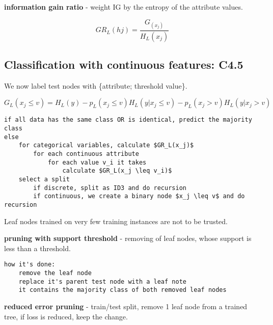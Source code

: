 \documentclass{article}
\newcommand{\para}[0]{\par\vspace{0.2cm}\noindent}
\newcommand{\define}[2]{\textbf{#1} - {#2}.  \para}
\begin{document}
\define{information gain ratio}
           {weight IG by the entropy of the attribute values}
$$ GR_L(hj) = \frac{G_(x_j)}{H_L(x_j)} $$


\subsection{Classification with continuous features: C4.5}
We now label test nodes with \{attribute; threshold value\}.

$$ G_L(x_j \leq v) = H_L(y) - p_L(x_j \leq v) H_L(y|x_j \leq v) - p_L(x_j > v) H_L(y|x_j > v)$$

\begin{verbatim}
if all data has the same class OR is identical, predict the majority class
else
    for categorical variables, calculate $GR_L(x_j)$
        for each continuous attribute
            for each value v_i it takes
                calculate $GR_L(x_j \leq v_i)$
    select a split
        if discrete, split as ID3 and do recursion
        if continuous, we create a binary node $x_j \leq v$ and do recursion
\end{verbatim}

Leaf nodes trained on very few training instances are not to be trusted.

\define{pruning with support threshold}
           {removing of leaf nodes, whose support is less than a threshold}

\begin{verbatim}
how it's done:
    remove the leaf node
    replace it's parent test node with a leaf note
    it contains the majority class of both removed leaf nodes
\end{verbatim}

\define{reduced error pruning}
           {train/test split, remove 1 leaf node from a trained tree, if loss is reduced, keep the change}
\end{document}
